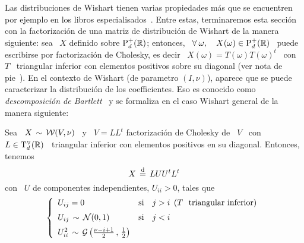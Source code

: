 Las distribuciones de Wishart tienen  varias propiedades m\'as que se encuentren
por ejemplo  en los  libros especialisados~\cite{Mui82, GupNag99,  And03, Seb04,
  KotNad04}. Entre estas, terminaremos  esta secci\'on con la factorizaci\'on de
una  matriz de  distribuci\'on de  Wishart  de la  manera siguiente:  sea \  $X$
definido  sobre  $\mathrm{P}_d^+(\mathbb{R})$;  entonces,   \  $\forall  \:  \omega,  \quad
X(\omega)  \in  \mathrm{P}_d^+(\mathbb{R})$  \  puede  escribirse  por  factorizaci\'on  de
Cholesky,  es  decir  \ $X(\omega)  =  T(\omega)  T(\omega)^t$  \  con \  $T$  \
triangular  inferior con  elementos positivos  sobre  su diagonal  (ver nota  de
pie~\footref{Foot:MP:WishartXtilde}).  En  el contexto de  Wishart (de parametro
$(I,\nu)$),  aparece  que  se   puede  caracterizar  la  distribuci\'on  de  los
coefficientes.     Eso    es   conocido    como    {\em   descomposici\'on    de
  Bartlett}~\cite{Bar34,  Mui82,  BilBre99,  GupNag99,  And03,  KotNad04}  y  se
formaliza en el caso Wishart general de la manera siguiente:
%
\begin{teorema}\label{Teo:MP:Bartlett}
%
  Sea \ $X \,  \sim \, \mathcal{W}(V,\nu)$ \ y \ $V =  L L^t$ factorizaci\'on de Cholesky
  de  \ $V$  \ con  \ $L  \in \mathrm{T}^\triangledown_d(\mathbb{R})$  \ triangular  inferior con elementos positivos en su diagonal. Entonces,
  tenemos
  \[
  X \, \stackrel{\mathrm{d}}{=} \, L U U^t L^t
  \]
  con \ $U$ de componentes independientes, $U_{ii} > 0$, tales que
  \[
  \left\{\begin{array}{lll}
  U_{ij} = 0 & \mbox{si} & j > i \:\: \mbox{($T$ \ triangular inferior)}\\[2mm]
  U_{ij} \, \sim \, \mathcal{N}(0,1) & \mbox{si} & j < i\\[2mm]
  U_{ii}^2 \, \sim \, \mathcal{G}\left( \frac{\nu-i+1}{2} \, , \, \frac12 \right) & &
  \end{array}\right.
  \]
\end{teorema}
%
